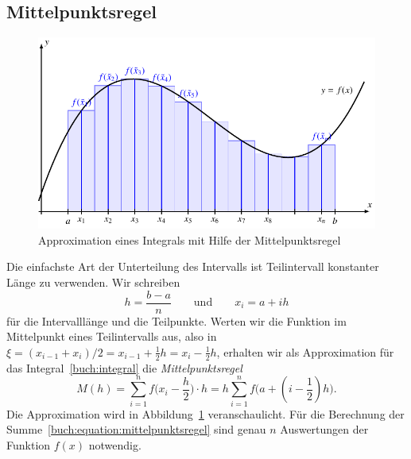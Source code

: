 \subsection{Mittelpunktsregel
\label{buch:subsection:mittelpunkt}}
\begin{figure}
\centering
\includegraphics{chapters/40-integration/figures/mittelpunkt.pdf}
\caption{Approximation eines Integrals mit Hilfe der Mittelpunktsregel
\label{buch:figure:mittelpunkt}}
\end{figure}
%
Die einfachste Art der Unterteilung des Intervalls ist Teilintervall
konstanter Länge zu verwenden. 
Wir schreiben
\[
h = \frac{b-a}n
\qquad\text{und}\qquad
x_i = a + ih
\]
für die Intervalllänge und die Teilpunkte.
Werten wir die Funktion im Mittelpunkt eines Teilintervalls aus, also
in $\xi = (x_{i-1}+x_i)/2 = x_{i-1}+\frac12h = x_i -\frac12h$,
erhalten wir als Approximation für das Integral~\eqref{buch:integral}
die {\em Mittelpunktsregel}
%
\begin{equation}
M(h)
=
\sum_{i=1}^n f\biggl(x_i - \frac{h}2\biggr) \cdot h
=
h
\sum_{i=1}^n f\bigl(a+(i-{\textstyle\frac12})h\bigr).
\label{buch:equation:mittelpunktsregel}
\end{equation}
Die Approximation wird in Abbildung~\ref{buch:figure:mittelpunkt}
veranschaulicht.
Für die Berechnung der Summe~\eqref{buch:equation:mittelpunktsregel}
sind genau $n$ Auswertungen der Funktion $f(x)$ notwendig.

